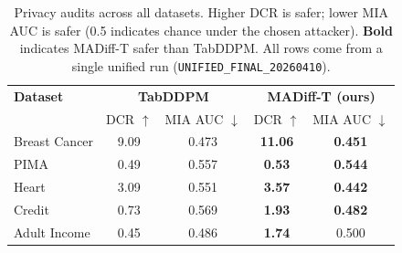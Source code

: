 \begin{table}[!t]
\centering
\caption{Privacy audits across all datasets. Higher DCR is safer;
lower MIA AUC is safer (0.5 indicates chance under the chosen
attacker). \textbf{Bold} indicates MADiff-T safer than TabDDPM.
All rows come from a single unified run
(\texttt{UNIFIED\_FINAL\_20260410}).}
\label{tab:results_privacy_all}
\scriptsize
\setlength{\tabcolsep}{5.5pt}
\renewcommand{\arraystretch}{1.15}
\begin{tabular}{l|c c|c c}
\rowcolor{gray!20}
\textbf{Dataset} &
\multicolumn{2}{c|}{\textbf{TabDDPM}} &
\multicolumn{2}{c}{\textbf{MADiff-T (ours)}} \\
\rowcolor{gray!20}
& DCR $\uparrow$ & MIA AUC $\downarrow$ & DCR $\uparrow$ & MIA AUC $\downarrow$ \\
\hline
Breast Cancer & 9.09 & 0.473 & \textbf{11.06} & \textbf{0.451} \\
PIMA & 0.49 & 0.557 & \textbf{0.53} & \textbf{0.544} \\
Heart & 3.09 & 0.551 & \textbf{3.57} & \textbf{0.442} \\
Credit & 0.73 & 0.569 & \textbf{1.93} & \textbf{0.482} \\
Adult Income & 0.45 & 0.486 & \textbf{1.74} & 0.500 \\
\end{tabular}
\end{table}
